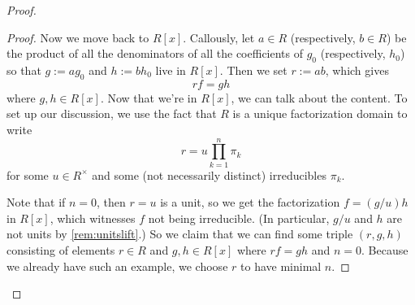 \begin{proof}
\begin{proof}
		Now we move back to $R[x]$. Callously, let $a\in R$ (respectively, $b\in R$) be the product of all the denominators of all the coefficients of $g_0$ (respectively, $h_0$) so that $g:=ag_0$ and $h:=bh_0$ live in $R[x]$. Then we set $r:=ab$, which gives
		\[rf=gh\]
		where $g,h\in R[x]$. Now that we're in $R[x]$, we can talk about the content. To set up our discussion, we use the fact that $R$ is a unique factorization domain to write
		\[r=u\prod_{k=1}^n\pi_k\]
		for some $u\in R^\times$ and some (not necessarily distinct) irreducibles $\pi_k$.

		Note that if $n=0$, then $r=u$ is a unit, so we get the factorization $f=(g/u)h$ in $R[x]$, which witnesses $f$ not being irreducible. (In particular, $g/u$ and $h$ are not units by \autoref{rem:unitslift}.) So we claim that we can find some triple $(r,g,h)$ consisting of elements $r\in R$ and $g,h\in R[x]$ where $rf=gh$ and $n=0$. Because we already have such an example, we choose $r$ to have minimal $n$.


\end{proof}
\end{proof}
